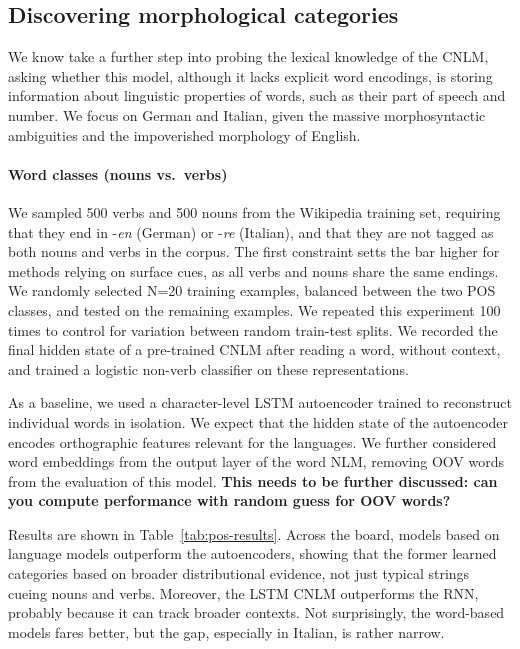 

\subsection{Discovering morphological categories}
\label{sec:categories}

We know take a further step into probing the lexical knowledge of the
CNLM, asking whether this model, although it lacks explicit word
encodings, is storing information about linguistic properties of
words, such as their part of speech and number. We focus on German and
Italian, given the massive morphosyntactic ambiguities and the
impoverished morphology of English.

\paragraph{Word classes (nouns vs.~verbs)}

We sampled 500 verbs and 500 nouns from the Wikipedia training set,
requiring that they end in -\emph{en} (German) or -\emph{re}
(Italian), and that they are not tagged as both nouns and verbs in the
corpus. The first constraint setts the bar higher for methods relying
on surface cues, as all verbs and nouns share the same endings. We
randomly selected N=20 training examples, balanced between the two POS
classes, and tested on the remaining examples.  We repeated this
experiment 100 times to control for variation between random
train-test splits. We recorded the final hidden state of a pre-trained
CNLM after reading a word, without context, and trained a logistic
non-verb classifier on these representations.

As a baseline, we used a character-level LSTM autoencoder trained to
reconstruct individual words in isolation.  We expect that the hidden
state of the autoencoder encodes orthographic features relevant for
the languages.  We further considered word embeddings from the output
layer of the word NLM, removing OOV words from the evaluation of this
model. \textbf{This needs to be further discussed: can you compute
  performance with random guess for OOV words?}

Results are shown in Table~\ref{tab:pos-results}.  Across the board,
models based on language models outperform the autoencoders, showing
that the former learned categories based on broader distributional
evidence, not just typical strings cueing nouns and verbs. Moreover,
the LSTM CNLM outperforms the RNN, probably because it can track
broader contexts. Not surprisingly, the word-based models fares
better, but the gap, especially in Italian, is rather narrow.


